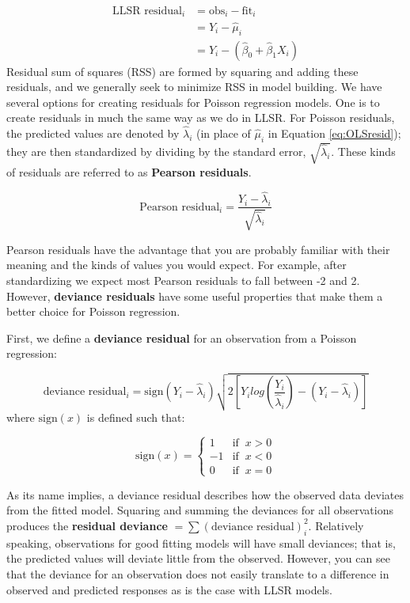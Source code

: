 \documentclass[
]{krantz}
\begin{document}
\begin{align}
 \textrm{LLSR residual}_i  &= \textrm{obs}_i - \textrm{fit}_i \nonumber \\
&={Y_i-\hat{\mu}_i} \nonumber \\
 &= Y_i-(\hat{\beta}_0 +\hat{\beta}_1 X_i)
\label{eq:OLSresid}
 \end{align}
Residual sum of squares (RSS) are formed by squaring and adding these residuals, and we generally seek to minimize RSS in model building. We have several options for creating residuals for Poisson regression models. One is to create residuals in much the same way as we do in LLSR. For Poisson residuals, the predicted values are denoted by \(\hat{\lambda}_i\) (in place of \(\hat{\mu}_i\) in Equation \eqref{eq:OLSresid}); they are then standardized by dividing by the standard error, \(\sqrt{\hat{\lambda}_i}\). These kinds of residuals are referred to as \textbf{Pearson residuals}. 

\begin{equation*}
\textrm{Pearson residual}_i = \frac{Y_i-\hat{\lambda}_i}{\sqrt{\hat{\lambda}_i}}
\end{equation*}

Pearson residuals have the advantage that you are probably familiar with their meaning and the kinds of values you would expect. For example, after standardizing we expect most Pearson residuals to fall between -2 and 2. However, \textbf{deviance residuals}  have some useful properties that make them a better choice for Poisson regression.

First, we define a \textbf{deviance residual} for an observation from a Poisson regression:

\begin{equation*}
\textrm{deviance residual}_i = \textrm{sign}(Y_i-\hat{\lambda}_i)
\sqrt{
2 \left[Y_i log\left(\frac{Y_i}{\hat{\lambda}_i}\right)
-(Y_i - \hat{\lambda}_i) \right]}
\end{equation*}
where \(\textrm{sign}(x)\) is defined such that:

\[ \textrm{sign}(x) = \begin{cases} 1  & \textrm{if }\ x > 0 \\
                                    -1 & \textrm{if }\ x < 0  \\
                                    0  & \textrm{if }\ x = 0\end{cases}\]

As its name implies, a deviance residual describes how the observed data deviates from the fitted model. Squaring and summing the deviances for all observations produces the \textbf{residual deviance} \(=\sum (\textrm{deviance residual})^2_i\).  Relatively speaking, observations for good fitting models will have small deviances; that is, the predicted values will deviate little from the observed. However, you can see that the deviance for an observation does not easily translate to a difference in observed and predicted responses as is the case with LLSR models.
\end{document}

